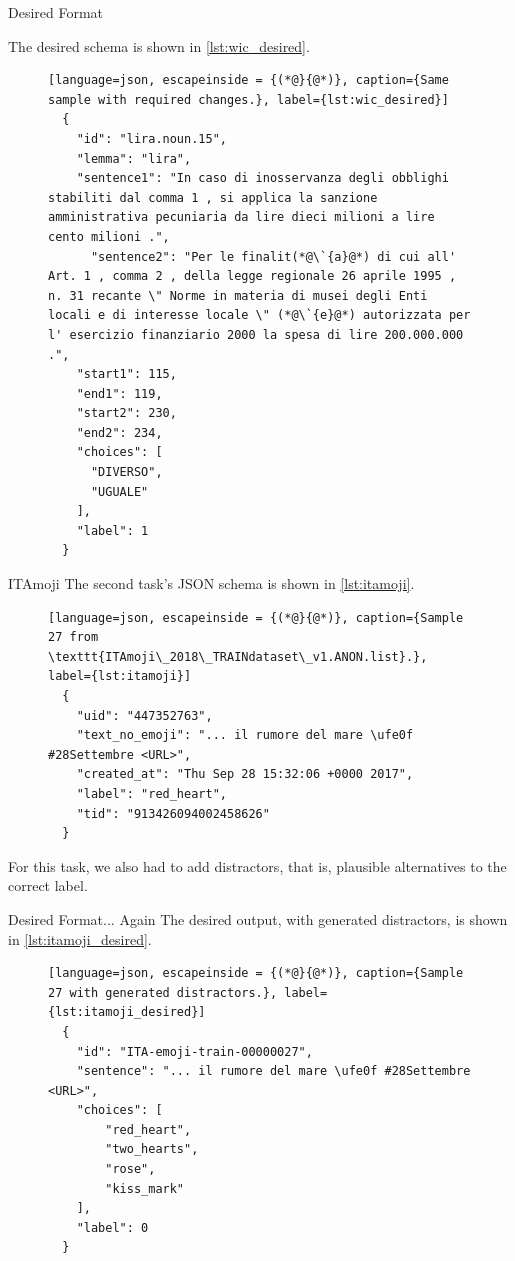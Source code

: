\documentclass[english, xcolor={table,usenames}]{beamer}
\begin{document}
\begin{frame}[fragile]{Desired Format}

  The desired schema is shown in \cref{lst:wic_desired}.


  \begin{figure}[H]
    \centering
    \begin{lstlisting}[language=json, escapeinside = {(*@}{@*)}, caption={Same sample with required changes.}, label={lst:wic_desired}]
  {
    "id": "lira.noun.15",
    "lemma": "lira",
    "sentence1": "In caso di inosservanza degli obblighi stabiliti dal comma 1 , si applica la sanzione amministrativa pecuniaria da lire dieci milioni a lire cento milioni .",
      "sentence2": "Per le finalit(*@\`{a}@*) di cui all' Art. 1 , comma 2 , della legge regionale 26 aprile 1995 , n. 31 recante \" Norme in materia di musei degli Enti locali e di interesse locale \" (*@\`{e}@*) autorizzata per l' esercizio finanziario 2000 la spesa di lire 200.000.000 .",
    "start1": 115,
    "end1": 119,
    "start2": 230,
    "end2": 234,
    "choices": [
      "DIVERSO",
      "UGUALE"
    ],
    "label": 1
  }
\end{lstlisting}
  \end{figure}
\end{frame}

\begin{frame}[fragile]{ITAmoji}
  The second task's JSON schema is shown in \cref{lst:itamoji}.
  \begin{figure}[H]
    \centering
    \begin{lstlisting}[language=json, escapeinside = {(*@}{@*)}, caption={Sample 27 from \texttt{ITAmoji\_2018\_TRAINdataset\_v1.ANON.list}.}, label={lst:itamoji}]
  {
    "uid": "447352763",
    "text_no_emoji": "... il rumore del mare \ufe0f #28Settembre <URL>",
    "created_at": "Thu Sep 28 15:32:06 +0000 2017",
    "label": "red_heart",
    "tid": "913426094002458626"
  }
  \end{lstlisting}
  \end{figure}

  For this task, we also had to add \alert{distractors}, that is, plausible alternatives to the correct label.

\end{frame}


\begin{frame}[fragile]{Desired Format... Again}
  The desired output, with generated distractors, is shown in \cref{lst:itamoji_desired}.

  \begin{figure}[H]
    \centering
    \begin{lstlisting}[language=json, escapeinside = {(*@}{@*)}, caption={Sample 27 with generated distractors.}, label={lst:itamoji_desired}]
  {
    "id": "ITA-emoji-train-00000027",
    "sentence": "... il rumore del mare \ufe0f #28Settembre <URL>",
    "choices": [
        "red_heart",
        "two_hearts",
        "rose",
        "kiss_mark"
    ],
    "label": 0
  }
  \end{lstlisting}
  \end{figure}
\end{frame}
\end{document}
